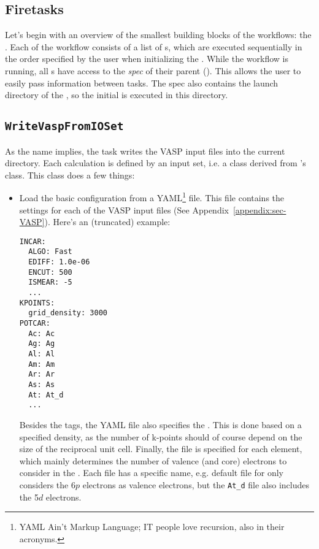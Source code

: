 \begin{refsection}
\section{Firetasks} \label{automation:sec-firetasks} 
 
Let's begin with an overview of the smallest building blocks of the workflows: 
the . Each  of the workflow consists of a list 
of s, which are executed sequentially in the order specified by 
the user when initializing the . While the workflow is 
running, all s have access to the \textit{spec} of their parent 
 (). This allows the user 
to easily pass information between tasks. The spec also contains the launch 
directory of the , so the initial  is executed 
in this directory. 
 
\subsection{\texttt{WriteVaspFromIOSet}} 
\label{automation:sec-WriteVaspFromIOSet} 
 
As the name implies, the  task writes the 
VASP input files into the current directory. Each calculation is 
defined by an input set, i.e. a class derived from 's 
 class. This class does a few things: 
 
\begin{itemize} 
 
\item Load the basic configuration from a YAML\footnote{YAML Ain't Markup 
Language; IT people love recursion, also in their acronyms.} file. This file 
contains the settings for each of the VASP input files (See 
Appendix~\ref{appendix:sec-VASP}). Here's an (truncated) example: 
\begin{verbatim} 
INCAR: 
  ALGO: Fast 
  EDIFF: 1.0e-06 
  ENCUT: 500 
  ISMEAR: -5 
  ... 
KPOINTS: 
  grid_density: 3000 
POTCAR: 
  Ac: Ac 
  Ag: Ag 
  Al: Al 
  Am: Am 
  Ar: Ar 
  As: As 
  At: At_d 
  ... 
\end{verbatim} 
Besides the  tags, the YAML file also specifies the 
. This is done based on 
a specified density, as the number of k-points should of course depend on the 
size of the reciprocal unit cell. Finally, the  file is specified 
for each element, which mainly determines the number of valence (and core) 
electrons to consider in the . Each 
 file has a specific name, e.g. default file for  only 
considers the 6$p$ electrons as valence electrons, but the \texttt{At\_d} file 
also includes the 5$d$ electrons. 
 

\end{itemize}
\end{refsection}
